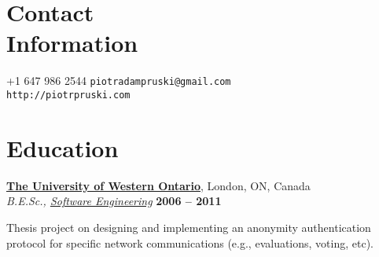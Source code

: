 \documentclass[margin,line]{resume}
\begin{document}
\begin{resume}

\section{\mysidestyle Contact\\Information}

	+1 647 986 2544	\hfill \texttt{piotradampruski@gmail.com}	\vspace{0mm}\\\vspace{0mm}
			\hfill \texttt{http://piotrpruski.com}		\vspace{0mm}\\\vspace{-4.5mm}



\section{\mysidestyle Education}

	\textbf{\href{http://www.uwo.ca/}{The University of Western Ontario}}, London, ON, Canada	\vspace{2mm}\\\vspace{1mm}
	\textsl{B.E.Sc., \href{http://www.eng.uwo.ca/undergraduate/programs/Software.htm}{Software Engineering}}	\hfill \textbf{ 2006 -- 2011}\vspace{-3mm}\\\vspace{-1mm}
	\begin{list2}
		\item Thesis project on designing and implementing an anonymity authentication protocol for specific network communications (e.g., evaluations, voting, etc).
	\end{list2}\vspace{-1.5mm}


\end{resume}
\end{document}
